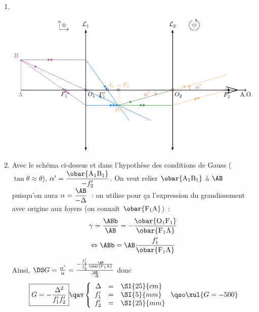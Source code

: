 \documentclass[../../main/main.tex]{subfiles}
\begin{document}
{\begin{enumerate}
\[			      \left\{
			      \begin{array}{rcl}
				      f'_1   & = & \SI{5}{mm}   \\
				      \Delta & = & \SI{250}{mm}
			      \end{array}
			      \right.
			      \qso
			      \xul{\obar{\rm F_1A} = \SI{-0.1}{mm}}\]
		\item ~
		      \begin{center}
			      \includegraphics[width=\linewidth]{microscope.pdf}
			      \label{fig:microscope}
		      \end{center}

		\item Avec le schéma ci-dessus et dans l'hypothèse des conditions de Gauss
		      ($\tan\theta \approx \theta$), $\alpha' = \dfrac{\obar{\rm
					      A_1B_1}}{-f'_2}$. On veut relier $\obar{\rm A_1B_1}$ à $\AB$ puisqu'on
		      aura $\alpha = \dfrac{\AB}{-\Delta}$~: on utilise pour ça l'expression
		      du grandissement avec origine aux foyers (on connaît $\obar{\rm
				      F_1A}$)~:
		      \begin{gather*}
			      \gamma = \frac{\ABb}{\AB} = - \frac{\obar{\rm O_1F_1}}{\obar{\rm
					      F_1A}}
			      \\\Leftrightarrow
			      \ABb = \AB \frac{f'_1}{\obar{\rm F_1A}}
		      \end{gather*}
		      Ainsi,
		      $\DS G = \frac{\alpha'}{\alpha} =
			      \frac{- \frac{f'_1}{f'_2} \frac{\AB}{\obar{\rm F_1A}}}
			      {\frac{\AB}{-\Delta}}$ donc
		      \[
			      \boxed{G = -\frac{\Delta^2}{f'_1f'_2}}
			      \qav
			      \left\{
			      \begin{array}{rcl}
				      \Delta & = & \SI{25}{cm} \\
				      f'_1   & = & \SI{5}{mm}  \\
				      f'_2   & = & \SI{25}{mm}
			      \end{array}
			      \right.
			      \qso
			      \xul{G=-500}
		      \]
	\end{enumerate}
}
\end{document}
